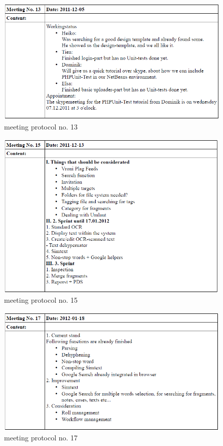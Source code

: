 \begin{appendix}
\begin{figure}[htbp]
  \centering
    \includegraphics[width=\textwidth]{images/a_meetings/meeting_13}
  \caption{meeting protocol no. 13}
  \label{fig:meeting protocol no. 13}
\end{figure}

\begin{figure}[htbp]
  \centering
    \includegraphics[width=\textwidth]{images/a_meetings/meeting_15}
  \caption{meeting protocol no. 15}
  \label{fig:meeting protocol no. 15}
\end{figure}

\begin{figure}[htbp]
  \centering
    \includegraphics[width=\textwidth]{images/a_meetings/meeting_17}
  \caption{meeting protocol no. 17}
  \label{fig:meeting protocol no. 17}
\end{figure}


\end{appendix}
